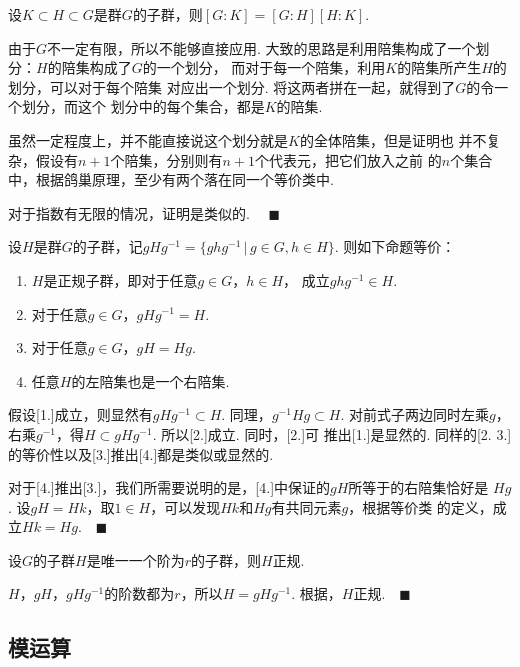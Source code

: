   \begin{thm}[指数可乘性]
    设$K\subset H\subset G$是群$G$的子群，则$[G:K]=[G:H][H:K]$.
  \end{thm}
  \proof
    由于$G$不一定有限，所以不能够直接应用.
    大致的思路是利用陪集构成了一个划分：$H$的陪集构成了$G$的一个划分，
    而对于每一个陪集，利用$K$的陪集所产生$H$的划分，可以对于每个陪集
    对应出一个划分. 将这两者拼在一起，就得到了$G$的令一个划分，而这个
    划分中的每个集合，都是$K$的陪集.\par
    虽然一定程度上，并不能直接说这个划分就是$K$的全体陪集，但是证明也
    并不复杂，假设有$n+1$个陪集，分别则有$n+1$个代表元，把它们放入之前
    的$n$个集合中，根据鸽巢原理，至少有两个落在同一个等价类中.\par
    对于指数有无限的情况，证明是类似的.
    $\quad\blacksquare$

  \begin{thm}
    \label{thm: 正规子群等价命题}
    设$H$是群$G$的子群，记$gHg^{-1}=\{ghg^{-1}\,|\,g\in G,h\in H\}$.
    则如下命题等价：
    \begin{enumerate}
      \item $H$是正规子群，即对于任意$g\in G$，$h\in H$，
        成立$ghg^{-1}\in H$.
      \item 对于任意$g\in G$，$gHg^{-1} = H$.
      \item 对于任意$g\in G$，$gH = Hg$.
      \item 任意$H$的左陪集也是一个右陪集.
    \end{enumerate}
  \end{thm}
  \proof
    假设[1.]成立，则显然有$gHg^{-1}\subset H$. 同理，$g^{-1}Hg\subset H$.
    对前式子两边同时左乘$g$，右乘$g^{-1}$，得\footnotemark$H\subset gHg^{-1}$.
     所以[2.]成立. 同时，[2.]可
    推出[1.]是显然的. 同样的[2. 3.]的等价性以及[3.]推出[4.]都是类似或显然的.\par
    对于[4.]推出[3.]，我们所需要说明的是，[4.]中保证的$gH$所等于的右陪集恰好是
    $Hg$. 设$gH = Hk$，取$1\in H$，可以发现$Hk$和$Hg$有共同元素$g$，根据等价类
    的定义，成立$Hk = Hg$.$\quad\blacksquare$

  \begin{pos}
    设$G$的子群$H$是唯一一个阶为$r$的子群，则$H$正规.
  \end{pos}
  \proof
    $H$，$gH$，$gHg^{-1}$的阶数都为$r$，所以$H=gHg^{-1}$.
    根据，$H$正规.$\quad\blacksquare$

\subsection{模运算}

